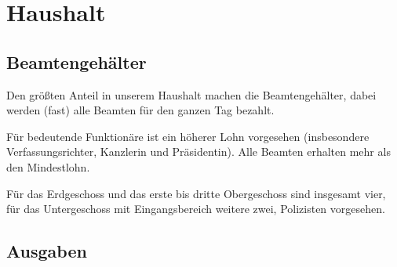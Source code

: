 \documentclass{sasbase}
\begin{document}
\newpage

\section{Haushalt}

\subsection{Beamtengehälter}

Den größten Anteil in unserem Haushalt machen die Beamtengehälter, dabei werden (fast) alle
Beamten für den ganzen Tag bezahlt.

Für bedeutende Funktionäre ist ein höherer Lohn vorgesehen (insbesondere Verfassungsrichter, Kanzlerin und Präsidentin). Alle Beamten erhalten mehr als den Mindestlohn.

Für das Erdgeschoss und das erste bis dritte Obergeschoss sind insgesamt vier, für das Untergeschoss
mit Eingangsbereich weitere zwei, Polizisten vorgesehen.

\vspace{5mm}

\begin{lohnrechnung}
\end{lohnrechnung}

\addtocounter{beamten}{\thetotal}

\subsection{Ausgaben}

\begin{kostenrechnung}
\end{kostenrechnung}
\end{document}
